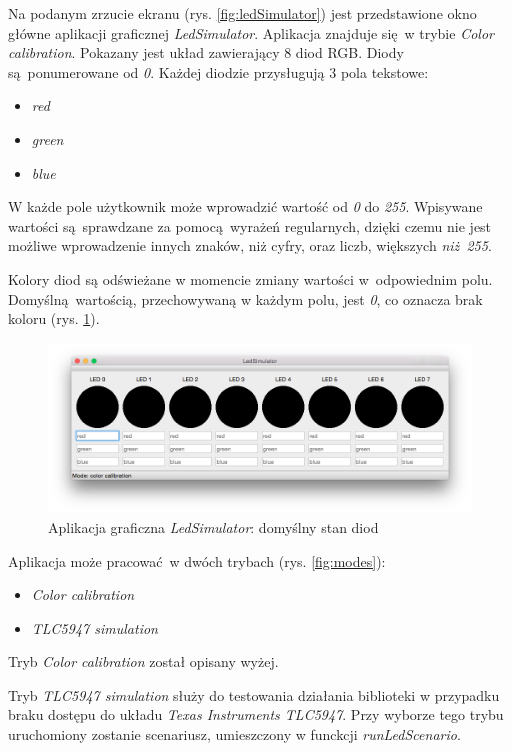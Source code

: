 \documentclass[eng,printmode]{mgr}
\begin{document}
Na podanym zrzucie ekranu (rys. \ref{fig:ledSimulator}) jest przedstawione okno główne aplikacji graficznej \emph{LedSimulator}. Aplikacja znajduje się w trybie \emph{Color calibration}. Pokazany jest układ zawierający 8 diod RGB. Diody są ponumerowane od \emph{0}. Każdej diodzie przysługują 3 pola tekstowe:

\begin{itemize}
  \item{\emph{red}}
  \item{\emph{green}}
  \item{\emph{blue}}
\end{itemize}

W każde pole użytkownik może wprowadzić wartość od \emph{0} do \emph{255}. Wpisywane wartości są sprawdzane za pomocą wyrażeń regularnych, dzięki czemu nie jest możliwe wprowadzenie innych znaków, niż cyfry, oraz liczb, większych \emph{niż 255}.

Kolory diod są odświeżane w momencie zmiany wartości w odpowiednim polu. Domyślną wartością, przechowywaną w każdym polu, jest \emph{0}, co oznacza brak koloru (rys. \ref{fig:ledSimulator2}).

\begin{figure}[!ht]
    \centering
    \includegraphics[width=\textwidth]{Figures/ledSimulator2.png} 
    \caption{Aplikacja graficzna \emph{LedSimulator}: domyślny stan diod}
    \label{fig:ledSimulator2}
\end{figure}


Aplikacja może pracować w dwóch trybach (rys. \ref{fig:modes}):

\begin{itemize}
  \item{\emph{Color calibration}}
  \item{\emph{TLC5947 simulation}}
\end{itemize}

Tryb \emph{Color calibration} został opisany wyżej.

Tryb \emph{TLC5947 simulation} służy do testowania działania biblioteki w przypadku braku dostępu do układu \emph{Texas Instruments TLC5947}. Przy wyborze tego trybu uruchomiony zostanie scenariusz, umieszczony w funckcji \emph{runLedScenario}. 
\end{document}
